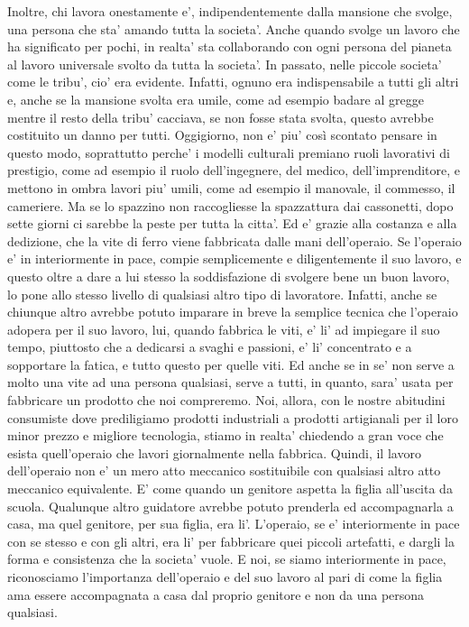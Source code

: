 Inoltre, chi lavora onestamente e', indipendentemente dalla mansione che svolge, una persona che sta' amando tutta la societa'. Anche quando svolge un lavoro che ha significato per pochi, in realta' sta collaborando con ogni persona del pianeta al lavoro universale svolto da tutta la societa'. 
In passato, nelle piccole societa' come le tribu', cio' era evidente. Infatti, ognuno era indispensabile a tutti gli altri e, anche se la mansione svolta era umile, come ad esempio badare al gregge mentre il resto della tribu' cacciava,  se non fosse stata svolta, questo avrebbe costituito un danno per tutti.
Oggigiorno, non e' piu' così scontato pensare in questo modo, soprattutto perche' i modelli culturali premiano ruoli lavorativi di prestigio, come ad esempio il ruolo dell'ingegnere, del medico, dell'imprenditore, e mettono in ombra lavori piu' umili, come ad esempio il manovale, il commesso, il cameriere. 
Ma se lo spazzino non raccogliesse la spazzattura dai cassonetti, dopo sette giorni ci sarebbe la peste per tutta la citta'. Ed e' grazie alla costanza e alla dedizione, che la vite di ferro viene fabbricata dalle mani dell'operaio. Se l'operaio e' in interiormente in pace, compie semplicemente e diligentemente il suo lavoro, e questo oltre a dare a lui stesso la soddisfazione di svolgere bene un buon lavoro, lo pone allo stesso livello di qualsiasi altro tipo di lavoratore. 
Infatti, anche se chiunque altro avrebbe potuto imparare in breve la semplice tecnica che l'operaio adopera per il suo lavoro, lui, quando fabbrica le viti, e' li' ad impiegare il suo tempo, piuttosto che a dedicarsi a svaghi e passioni, e' li' concentrato e a sopportare la fatica, e tutto questo per quelle viti. 
Ed anche se in se' non serve a molto una vite ad una persona qualsiasi, serve a tutti, in quanto, sara' usata per fabbricare un prodotto che noi compreremo. 
Noi, allora, con le nostre abitudini consumiste dove prediligiamo prodotti industriali a prodotti artigianali per il loro minor prezzo e migliore tecnologia, stiamo in realta' chiedendo a gran voce che esista quell'operaio che lavori giornalmente nella fabbrica.
Quindi, il lavoro dell'operaio non e' un mero atto meccanico sostituibile con qualsiasi altro atto meccanico equivalente. E' come quando un genitore aspetta la figlia all'uscita da scuola. Qualunque altro guidatore avrebbe potuto prenderla ed accompagnarla a casa, ma quel genitore, per sua figlia, era li'. 
L'operaio, se e' interiormente in pace con se stesso e con gli altri, era li' per fabbricare quei piccoli artefatti, e dargli la forma e consistenza che la societa' vuole. E noi, se siamo interiormente in pace, riconosciamo l'importanza dell'operaio e del suo lavoro al pari di come la figlia ama essere accompagnata a casa dal proprio genitore e non da una persona qualsiasi.

